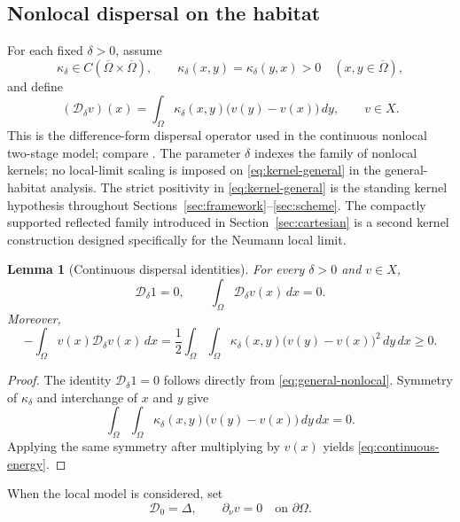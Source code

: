 \documentclass[11pt]{article}
\newtheorem{lemma}[theorem]{Lemma}
\theoremstyle{definition}
\newcommand{\cD}{\mathcal{D}}
\begin{document}
\subsection{Nonlocal dispersal on the habitat}

For each fixed $\delta>0$, assume
\begin{equation}
\label{eq:kernel-general}
 \kappa_\delta\in C(\overline\Omega\times\overline\Omega),
 \qquad
 \kappa_\delta(x,y)=\kappa_\delta(y,x)>0
 \quad (x,y\in\overline\Omega),
\end{equation}
and define
\begin{equation}
\label{eq:general-nonlocal}
 (\cD_\delta v)(x)
 =
 \int_\Omega
 \kappa_\delta(x,y)\big(v(y)-v(x)\big)\,dy,
 \qquad v\in X.
\end{equation}
This is the difference-form dispersal operator used in the continuous nonlocal two-stage model; compare \cite{Onyido2023,Onyido2024}.  The parameter $\delta$ indexes the family of nonlocal kernels; no local-limit scaling is imposed on \eqref{eq:kernel-general} in the general-habitat analysis. The strict positivity in \eqref{eq:kernel-general} is the standing kernel hypothesis throughout Sections~\ref{sec:framework}--\ref{sec:scheme}.  The compactly supported reflected family introduced in Section~\ref{sec:cartesian} is a second kernel construction designed specifically for the Neumann local limit.

\begin{lemma}[Continuous dispersal identities]
\label{lem:continuous-dispersal-identities}
For every $\delta>0$ and $v\in X$,
\[
 \cD_\delta 1=0,
 \qquad
 \int_\Omega \cD_\delta v(x)\,dx=0.
\]
Moreover,
\begin{equation}
\label{eq:continuous-energy}
 -\int_\Omega v(x)\cD_\delta v(x)\,dx
 =
 \frac12\int_\Omega\int_\Omega
 \kappa_\delta(x,y)\big(v(y)-v(x)\big)^2\,dy\,dx
 \ge0.
\end{equation}
\end{lemma}

\begin{proof}
The identity $\cD_\delta1=0$ follows directly from \eqref{eq:general-nonlocal}.  Symmetry of $\kappa_\delta$ and interchange of $x$ and $y$ give
\[
 \int_\Omega\int_\Omega
 \kappa_\delta(x,y)\big(v(y)-v(x)\big)\,dy\,dx=0.
\]
Applying the same symmetry after multiplying by $v(x)$ yields \eqref{eq:continuous-energy}.
\end{proof}

When the local model is considered, set
\begin{equation}
\label{eq:general-local}
 \cD_0=\Delta,
 \qquad
 \partial_\nu v=0\quad\text{on }\partial\Omega.
\end{equation}
\end{document}
